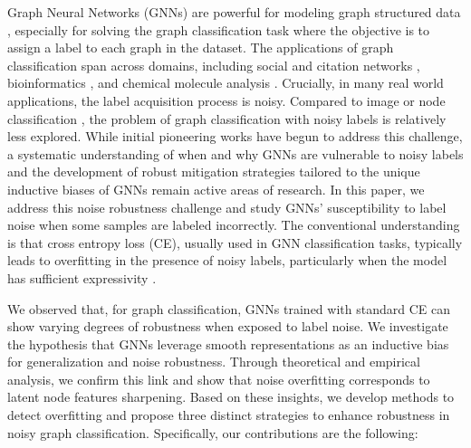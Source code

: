 
Graph Neural Networks (GNNs) are powerful for modeling graph structured data %
\citet{dgcnn}, especially for solving the graph classification task where the objective is to assign a label to each graph in the dataset.  
The applications of graph classification span across domains, including social and citation networks \citet{COLLAB}, bioinformatics \citet{proteins}, and chemical molecule analysis \citep{NCI}. Crucially, in many real world applications, the label acquisition process is noisy.
Compared to image \citet{algan2021image} or node classification \citet{nrgnn11}, the problem of graph classification with noisy labels is relatively less explored. While initial pioneering works \citet{nt2019revisiting, omg7} have begun to address this challenge, a systematic understanding of when and why GNNs are vulnerable to noisy labels and the development of robust mitigation strategies tailored to the unique inductive biases of GNNs remain active areas of research.
In this paper, we address this noise robustness challenge and study GNNs' susceptibility to label noise when some samples are labeled incorrectly. The conventional understanding is that cross entropy loss (CE), usually used in GNN classification tasks, typically leads to overfitting in the presence of noisy labels, particularly when the model has sufficient expressivity \citep{memorizenoise}. 

We observed that, for graph classification, GNNs trained with standard CE can show varying degrees of robustness when exposed to label noise.
We investigate the hypothesis that GNNs leverage smooth representations as an inductive bias for generalization and noise robustness. Through theoretical and empirical analysis, we confirm this link and show that noise overfitting corresponds to latent node features sharpening.  Based on these insights, we develop methods to detect overfitting and propose three distinct strategies to enhance robustness in noisy graph classification.
Specifically, our contributions are the following: 



